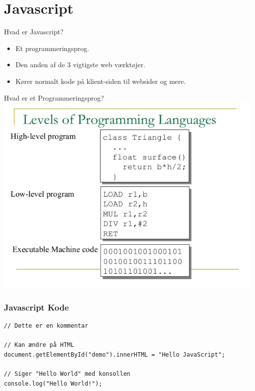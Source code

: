 \documentclass[10pt]{beamer}
\begin{document}
 
\section{Javascript}


\begin{frame}{Hvad er Javascript?}
	\begin{itemize}
		\item Et programmeringsprog.
		\item Den anden af de 3 vigtigste web værktøjer.
		\item Kører normalt kode på klient-siden til websider og mere.
	\end{itemize}
\end{frame}

\begin{frame}{Hvad er et Programmeringsprog?}
		\includegraphics[width=\linewidth]{img/programminglanguageslevels.jpg}
\end{frame}

\begin{frame}[fragile]
 \frametitle{Javascript Kode}

\begin{lstlisting}
// Dette er en kommentar

// Kan ændre på HTML
document.getElementById("demo").innerHTML = "Hello JavaScript";

// Siger "Hello World" med konsollen
console.log("Hello World!");
\end{lstlisting}
\end{frame}
\end{document}
